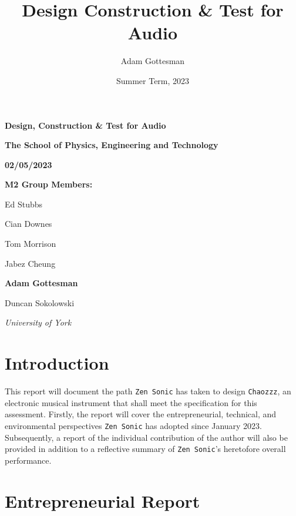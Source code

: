 \documentclass[12pt]{article}
\title{Design Construction \& Test for Audio}
\author{Adam Gottesman}
\date{Summer Term, 2023}
\begin{document}
\begin{titlepage}
\centering


\vspace{3cm}

{\LARGE \textbf{ Design, Construction \& Test for Audio}}



\vspace{2cm}

{\LARGE \textbf{ The School of Physics, Engineering and Technology}}

\vspace{2cm}
{\large \textbf{02/05/2023}}

\vspace{2cm}

{\LARGE \textbf{M2 Group Members:}}

{\large Ed Stubbs}

{\large Cian Downes}

{\large Tom Morrison}

{\large Jabez Cheung}

{\large \textbf{Adam Gottesman}}

{\large Duncan Sokolowski}







\vfill

{\itshape University of York}
\end{titlepage}

\tableofcontents
\newpage

\pagestyle{content}
\linespread{1}
\section{Introduction}


This report will document the path \texttt{Zen Sonic} has taken to design \texttt{Chaozzz}, an electronic musical instrument that shall meet the specification for this assessment. Firstly, the report will cover the entrepreneurial, technical, and environmental perspectives \texttt{Zen Sonic} has adopted since January 2023. Subsequently, a report of the individual contribution of the author will also be provided in addition to a reflective summary of \texttt{Zen Sonic}'s heretofore overall performance. 
\section{Entrepreneurial Report}
\end{document}
